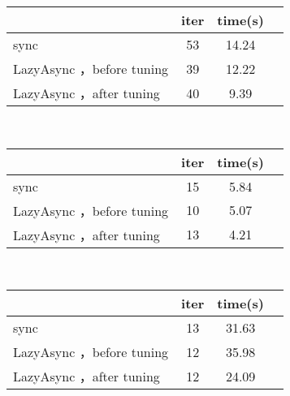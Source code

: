 \begin{table}[!htbp]
  \label{tab:tuning}
  \centering
  \footnotesize%
  \setlength{\tabcolsep}{4pt}%
  \renewcommand{\arraystretch}{1.2}%
  \begin{subtable}[t]{0.45\textwidth}
      \centering
      \label{tab:sample_1}
      \begin{tabular}{lccc}
          \hline
          & iter  & time(s) \\
          \hline
          sync & 53 & 14.24 \\
          \hline
          LazyAsync ，before tuning & 39 & 12.22 \\
          \hline
          LazyAsync ，after tuning & 40 & 9.39 \\
          \hline
      \end{tabular}
  \end{subtable}
  ~%
  \begin{subtable}[t]{0.45\textwidth}
      \centering
      \label{tab:sample_2}
      \begin{tabular}{lccc}
          \hline
          & iter & time(s) \\
          \hline
          sync & 15 & 5.84 \\
          \hline
          LazyAsync ，before tuning & 10 & 5.07 \\
          \hline
          LazyAsync ，after tuning & 13 & 4.21 \\
          \hline
      \end{tabular}
  \end{subtable}
  \\%
  \begin{subtable}[t]{0.45\textwidth}
      \centering
      \label{tab:sample_3}
      \begin{tabular}{lccc}
          \hline
          & iter  & time(s) \\
          \hline
          sync & 13& 31.63 \\
          \hline
          LazyAsync ，before tuning & 12 & 35.98 \\
          \hline
          LazyAsync ，after tuning & 12 & 24.09 \\

\end{tabular}
\end{subtable}
\end{table}
